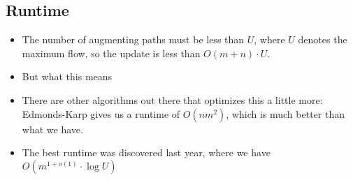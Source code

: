 \subsection{Runtime}
\begin{itemize}
	\item The number of augmenting paths must be less than $U$, where $U$ denotes the maximum flow, so 
		the update is less than $O(m + n) \cdot U$. 
	\item But what this means   
	\item There are other algorithms out there that optimizes this a little more: Edmonds-Karp gives 
		us a runtime of $O(n m^2)$, which is much better than what we have. 
	\item The best runtime was discovered last year, where we have $O(m^{1 + o(1)} \cdot \log U)$
\end{itemize}
